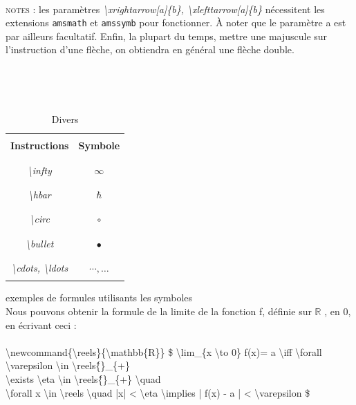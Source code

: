 \documentclass[a4paper, 10pt]{book}
\begin{document}
\textit{\\}

\textsc{notes :} les paramètres \textit{\textbackslash xrightarrow[a]\{b\}, \textbackslash xlefttarrow[a]\{b\}} nécessitent les extensions \texttt{amsmath} et \texttt{amssymb} pour fonctionner. À noter que le paramètre a est par ailleurs facultatif. Enfin, la plupart du temps, mettre une majuscule sur l'instruction d'une flèche, on obtiendra en général une flèche double.

\textit{\\}
\pagebreak

\begin{table}[ht]
\caption{\label{}Divers}
\textit{\\}
\centering
\begin{tabular}{|c|c|}
\hline \hline \\
\textbf{Instructions} & \textbf{Symbole} \\ \\
\hline \hline \\
\textit{\textbackslash infty} & $ \infty $ \\ \\
\hline \\
\textit{\textbackslash hbar} & $ \hbar $ \\ \\
\hline \\
\textit{\textbackslash circ} & $ \circ $ \\ \\
\hline \\
\textit{\textbackslash bullet} & $ \bullet $ \\ \\
\hline \\
\textit{\textbackslash cdots, \textbackslash ldots} &  $ \cdots , \ldots $ \\ \\
\hline 
\end{tabular} 
\end{table} 


\textsf{exemples de formules utilisants les symboles} \\

Nous pouvons obtenir la formule de la limite de la fonction f, définie sur $ \mathbb{R} $ , en 0, en écrivant ceci : \\ \\
\textsf{\textbackslash newcommand\{\textbackslash reels\}\{\textbackslash mathbb\{R\}\}
\$ \textbackslash lim\_\{x \textbackslash to 0\} f(x)= a \textbackslash iff 
\textbackslash forall \textbackslash varepsilon \textbackslash in \textbackslash reels\^\{\*\}\_\{+\}\quad \\
\textbackslash exists \textbackslash eta \textbackslash in \textbackslash reels\^\{\*\}\_\{+\} \textbackslash quad \\
\textbackslash forall x \textbackslash in \textbackslash reels \textbackslash quad |x|  < \textbackslash eta \textbackslash implies | f(x) - a | < \textbackslash varepsilon  \$}
\end{document}
